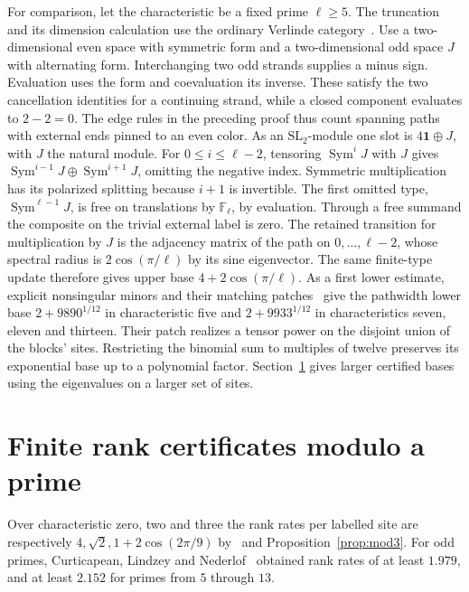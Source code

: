 \documentclass[11pt]{article}
\theoremstyle{definition}
\begin{document}
For comparison, let the characteristic be a fixed prime \(\ell\ge5\). The truncation and its dimension calculation use the ordinary Verlinde category~\cite[Section~5.1]{beo-verlinde}. Use a two-dimensional even space with symmetric form and a two-dimensional odd space \(J\) with alternating form. Interchanging two odd strands supplies a minus sign. Evaluation uses the form and coevaluation its inverse. These satisfy the two cancellation identities for a continuing strand, while a closed component evaluates to \(2-2=0\). The edge rules in the preceding proof thus count spanning paths with external ends pinned to an even color. As an \(\mathrm{SL}_2\)-module one slot is \(4\mathbf1\oplus J\), with \(J\) the natural module. For \(0\le i\le\ell-2\), tensoring \(\operatorname{Sym}^i J\) with \(J\) gives \(\operatorname{Sym}^{i-1}J\oplus\operatorname{Sym}^{i+1}J\), omitting the negative index. Symmetric multiplication has its polarized splitting because \(i+1\) is invertible. The first omitted type, \(\operatorname{Sym}^{\ell-1}J\), is free on translations by \(\mathbb F_\ell\), by evaluation. Through a free summand the composite on the trivial external label is zero. The retained transition for multiplication by \(J\) is the adjacency matrix of the path on \(0,\ldots,\ell-2\), whose spectral radius is \(2\cos(\pi/\ell)\) by its sine eigenvector. The same finite-type update therefore gives upper base \(4+2\cos(\pi/\ell)\). As a first lower estimate, explicit nonsingular minors and their matching patches~\cite[Lemma~3.1 and Corollary~3.6]{cln} give the pathwidth lower base \(2+9890^{1/12}\) in characteristic five and \(2+9933^{1/12}\) in characteristics seven, eleven and thirteen. Their patch realizes a tensor power on the disjoint union of the blocks' sites. Restricting the binomial sum to multiples of twelve preserves its exponential base up to a polynomial factor. Section~\ref{sec:mod-rank} gives larger certified bases using the eigenvalues on a larger set of sites.

\section{Finite rank certificates modulo a prime}\label{sec:mod-rank}

Over characteristic zero, two and three the rank rates per labelled site are respectively \(4,\sqrt2,1+2\cos(2\pi/9)\) by~\cite{cln,ckn} and Proposition~\ref{prop:mod3}. For odd primes, Curticapean, Lindzey and Nederlof~\cite[Theorem~1.3]{cln} obtained rank rates of at least \(1.979\), and at least \(2.152\) for primes from \(5\) through \(13\).
\end{document}
